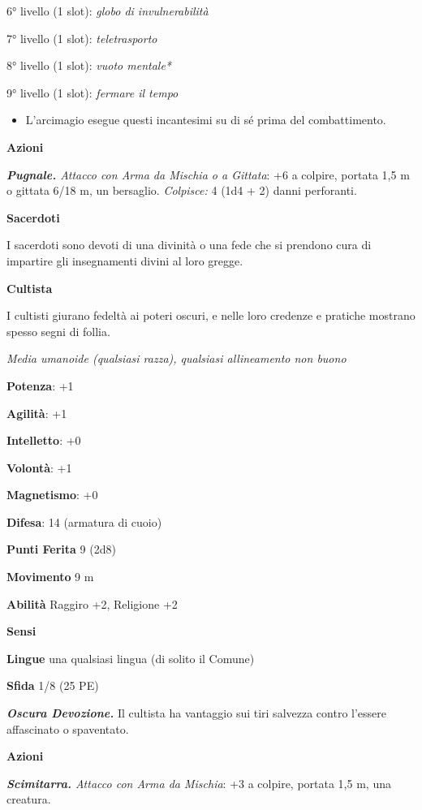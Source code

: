 \begin{multicols}{2}
6° livello (1 slot): \emph{globo di invulnerabilità}

7° livello (1 slot): \emph{teletrasporto}

8° livello (1 slot): \emph{vuoto mentale*}

9° livello (1 slot): \emph{fermare il tempo}


\begin{itemize}
\item
  L'arcimagio esegue questi incantesimi su di sé prima del
  combattimento.
\end{itemize}


\textbf{Azioni}

\emph{\textbf{Pugnale.} Attacco con Arma da Mischia o a Gittata}: +6 a
colpire, portata 1,5 m o gittata 6/18 m, un bersaglio. \emph{Colpisce:}
4 (1d4 + 2) danni perforanti.


\textbf{Sacerdoti}

I sacerdoti sono devoti di una divinità o una fede che si prendono cura
di impartire gli insegnamenti divini al loro gregge.

\textbf{Cultista}

I cultisti giurano fedeltà ai poteri oscuri, e nelle loro credenze e
pratiche mostrano spesso segni di follia.

\emph{Media umanoide (qualsiasi razza), qualsiasi allineamento non
buono}

\textbf{Potenza}: +1

\textbf{Agilità}: +1

\textbf{Intelletto}: +0

\textbf{Volontà}: +1

\textbf{Magnetismo}: +0

\textbf{Difesa}: 14 (armatura di cuoio)

\textbf{Punti Ferita} 9 (2d8)

\textbf{Movimento} 9 m

\textbf{Abilità} Raggiro +2, Religione +2

\textbf{Sensi} 

\textbf{Lingue} una qualsiasi lingua (di solito il Comune)

\textbf{Sfida} 1/8 (25 PE)

\emph{\textbf{Oscura Devozione.}} Il cultista ha vantaggio sui tiri
salvezza contro l'essere affascinato o spaventato.

\textbf{Azioni}

\emph{\textbf{Scimitarra.} Attacco con Arma da Mischia}: +3 a colpire,
portata 1,5 m, una creatura.


\end{multicols}
